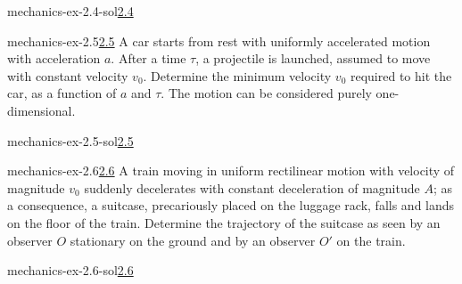 \documentclass[preview]{standalone}
\begin{document}
\begin{snippetsolution}{mechanics-ex-2.4-sol}{\underline{2.4}}
    \todo
\end{snippetsolution}

\begin{snippetexercise}{mechanics-ex-2.5}{\underline{2.5}}
    A car starts from rest with uniformly accelerated motion with acceleration \(a\).
    After a time \(\tau\), a projectile is launched, assumed to move with constant velocity \(v_0\).
    Determine the minimum velocity \(v_0\) required to hit the car, as a function of \(a\) and \(\tau\).
    The motion can be considered purely one-dimensional.
\end{snippetexercise}

\begin{snippetsolution}{mechanics-ex-2.5-sol}{\underline{2.5}}
    \todo
\end{snippetsolution}

\begin{snippetexercise}{mechanics-ex-2.6}{\underline{2.6}}
    A train moving in uniform rectilinear motion with velocity of magnitude \(v_0\) suddenly decelerates with
    constant deceleration of magnitude \(A\); as a consequence, a suitcase, precariously placed on the luggage rack,
    falls and lands on the floor of the train.
    Determine the trajectory of the suitcase as seen by an observer \(O\) stationary on the ground and by an
    observer \(O'\) on the train.
\end{snippetexercise}

\begin{snippetsolution}{mechanics-ex-2.6-sol}{\underline{2.6}}
    \todo
\end{snippetsolution}
\end{document}
